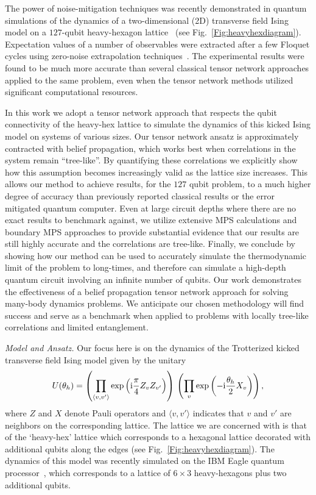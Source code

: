 \documentclass[%
 superscriptaddress,
 amsmath,amssymb,
 prx, nofootinbib,
]{revtex4-2}
\begin{document}
The power of noise-mitigation techniques was recently demonstrated in quantum simulations of the dynamics of a two-dimensional (2D) transverse field Ising model on a $127$-qubit heavy-hexagon lattice~\cite{kim2023} (see Fig.~\ref{Fig:heavyhexdiagram}). Expectation values of a number of observables were extracted after a few Floquet cycles using zero-noise extrapolation techniques~\cite{temme17}. The experimental results were found to be much more accurate than several classical tensor network approaches applied to the same problem, even when the tensor network methods utilized significant computational resources.

In this work we adopt a tensor network approach that respects the qubit connectivity of the heavy-hex lattice to simulate the dynamics of this kicked Ising model on systems of various sizes. Our tensor network ansatz is approximately contracted with belief propagation, which works best when correlations in the system remain ``tree-like''. By quantifying these correlations we explicitly show how this assumption becomes increasingly valid as the lattice size increases. This allows our method to achieve results, for the $127$ qubit problem, to a much higher degree of accuracy than previously reported classical results or the error mitigated quantum computer. Even at large circuit depths where there are no exact results to benchmark against, we utilize extensive MPS calculations and boundary MPS approaches to provide substantial evidence that our results are still highly accurate and the correlations are tree-like. Finally, we conclude by showing how our method can be used to accurately simulate the thermodynamic limit of the problem to long-times, and therefore can simulate a high-depth quantum circuit involving an infinite number of qubits.
Our work demonstrates the effectiveness of a belief propagation tensor network approach for solving many-body dynamics problems. We anticipate our chosen methodology will find success and serve as a benchmark when applied to problems with locally tree-like correlations and limited entanglement.

\emph{Model and Ansatz.} Our focus here is on the dynamics of the Trotterized kicked transverse field Ising model given by the unitary 
\begin{equation}
    U(\theta_{h}) = \left(\prod_{\langle v,v' \rangle}\exp \left({\rm i} \frac{\pi}{4}Z_{v}Z_{v'} \right)\right)\,\left(\prod_{v}\exp \left(-{\rm i} \frac{\theta_{h}}{2}X_{v}\right)\right),
    \label{Eq:Propagator}
\end{equation}
where $Z$ and $X$ denote Pauli operators and $\langle v,v' \rangle$ indicates that $v$ and $v'$ are neighbors on the corresponding lattice. The lattice we are concerned with is that of the `heavy-hex' lattice which corresponds to a hexagonal lattice decorated with additional qubits along the edges (see Fig.~\ref{Fig:heavyhexdiagram}). The dynamics of this model was recently simulated on the IBM Eagle quantum processor~\cite{kim2023}, which corresponds to a lattice of $6 \times 3$ heavy-hexagons plus two additional qubits. 
\end{document}
